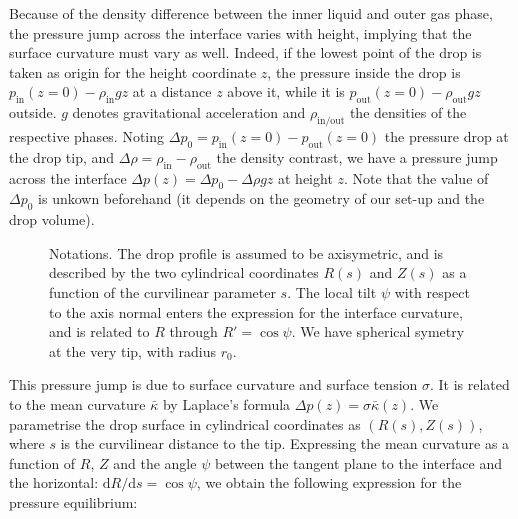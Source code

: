 \documentclass[fleqn]{scrartcl}
\newcommand{\ud}{\mathrm{d}}%
\newcommand{\grid}[2]{%
  \draw[step=0.1cm,gray,ultra thin] (-#1,-#2) grid (#1,#2);%
  \draw[step=0.5cm,gray,thin] (-#1,-#2) grid (#1,#2);%
  \draw[thick] (-#1,0) -- (#1,0);
  \draw[thick] (0,-#2) -- (0,#2);
}
\begin{document}
Because of the density difference between the inner liquid and outer
gas phase, the pressure jump across the interface varies with height,
implying that the surface curvature must vary as well. Indeed, if the
lowest point of the drop is taken as origin for the height coordinate
$z$, the pressure inside the drop is $p_{\mathrm{in}}(z=0) -
\rho_{\mathrm{in}} g z$ at a distance $z$ above it, while it is
$p_{\mathrm{out}}(z=0) - \rho_{\mathrm{out}} g z$ outside. $g$ denotes
gravitational acceleration and $\rho_{\mathrm{in/out}}$ the densities
of the respective phases. Noting $\Delta\! p_0 = p_{\mathrm{in}}(z=0)
- p_{\mathrm{out}}(z=0)$ the pressure drop at the drop tip, and
$\Delta\!\rho = \rho_{\mathrm{in}} - \rho_{\mathrm{out}}$ the density
contrast, we have a pressure jump across the interface $\Delta\! p(z)
= \Delta\! p_0 - \Delta\!\rho g z$ at height $z$. Note that the value
of $\Delta\! p_0$ is unkown beforehand (it depends on the geometry of
our set-up and the drop volume).

\begin{figure}
  \begin{captionbeside}{Notations. The drop profile is assumed to be
      axisymetric, and is described by the two cylindrical coordinates
      $R(s)$ and $Z(s)$ as a function of the curvilinear parameter
      $s$. The local tilt $\psi$ with respect to the axis normal
      enters the expression for the interface curvature, and is
      related to $R$ through $R' = \cos\psi$. We have spherical
      symetry at the very tip, with radius $r_0$.}
\end{captionbeside}
\label{fig:notations}
\end{figure}

This pressure jump is due to surface curvature and surface tension
$\sigma$. It is related to the mean curvature $\bar\kappa$ by Laplace's
formula $\Delta\! p(z) = \sigma \bar\kappa(z)$.  We parametrise the drop
surface in cylindrical coordinates as $(R(s), Z(s))$, where $s$ is the
curvilinear distance to the tip. Expressing the mean curvature as a
function of $R$, $Z$ and the angle $\psi$ between the tangent plane to
the interface and the horizontal: $\ud R/\ud s = \cos\psi$, we obtain
the following expression for the pressure equilibrium:
\end{document}
